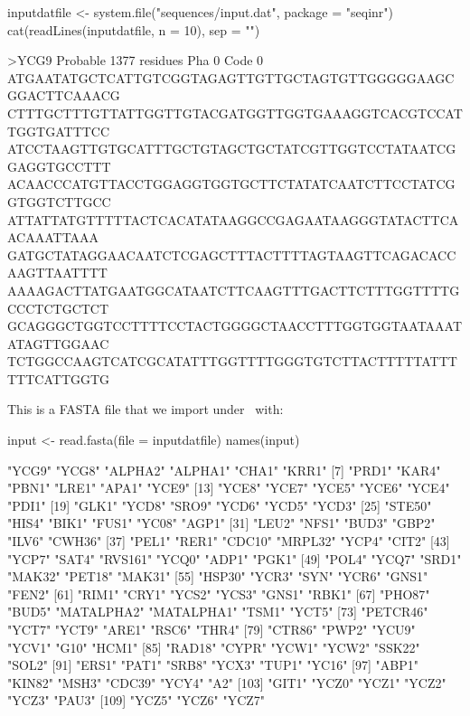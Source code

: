 \documentclass{article}
\begin{document}
\begin{Schunk}
\begin{Sinput}
 inputdatfile <- system.file("sequences/input.dat", package = "seqinr")
 cat(readLines(inputdatfile, n = 10), sep = "\n")
\end{Sinput}
\begin{Soutput}
>YCG9 Probable          1377 residues Pha 0 Code 0
ATGAATATGCTCATTGTCGGTAGAGTTGTTGCTAGTGTTGGGGGAAGCGGACTTCAAACG
CTTTGCTTTGTTATTGGTTGTACGATGGTTGGTGAAAGGTCACGTCCATTGGTGATTTCC
ATCCTAAGTTGTGCATTTGCTGTAGCTGCTATCGTTGGTCCTATAATCGGAGGTGCCTTT
ACAACCCATGTTACCTGGAGGTGGTGCTTCTATATCAATCTTCCTATCGGTGGTCTTGCC
ATTATTATGTTTTTACTCACATATAAGGCCGAGAATAAGGGTATACTTCAACAAATTAAA
GATGCTATAGGAACAATCTCGAGCTTTACTTTTAGTAAGTTCAGACACCAAGTTAATTTT
AAAAGACTTATGAATGGCATAATCTTCAAGTTTGACTTCTTTGGTTTTGCCCTCTGCTCT
GCAGGGCTGGTCCTTTTCCTACTGGGGCTAACCTTTGGTGGTAATAAATATAGTTGGAAC
TCTGGCCAAGTCATCGCATATTTGGTTTTGGGTGTCTTACTTTTTATTTTTTCATTGGTG
\end{Soutput}
\end{Schunk}

This is a FASTA file that we import under \Rlogo{}~with:

\begin{Schunk}
\begin{Sinput}
 input <- read.fasta(file = inputdatfile)
 names(input)
\end{Sinput}
\begin{Soutput}
  [1] "YCG9"      "YCG8"      "ALPHA2"    "ALPHA1"    "CHA1"      "KRR1"     
  [7] "PRD1"      "KAR4"      "PBN1"      "LRE1"      "APA1"      "YCE9"     
 [13] "YCE8"      "YCE7"      "YCE5"      "YCE6"      "YCE4"      "PDI1"     
 [19] "GLK1"      "YCD8"      "SRO9"      "YCD6"      "YCD5"      "YCD3"     
 [25] "STE50"     "HIS4"      "BIK1"      "FUS1"      "YC08"      "AGP1"     
 [31] "LEU2"      "NFS1"      "BUD3"      "GBP2"      "ILV6"      "CWH36"    
 [37] "PEL1"      "RER1"      "CDC10"     "MRPL32"    "YCP4"      "CIT2"     
 [43] "YCP7"      "SAT4"      "RVS161"    "YCQ0"      "ADP1"      "PGK1"     
 [49] "POL4"      "YCQ7"      "SRD1"      "MAK32"     "PET18"     "MAK31"    
 [55] "HSP30"     "YCR3"      "SYN"       "YCR6"      "GNS1"      "FEN2"     
 [61] "RIM1"      "CRY1"      "YCS2"      "YCS3"      "GNS1"      "RBK1"     
 [67] "PHO87"     "BUD5"      "MATALPHA2" "MATALPHA1" "TSM1"      "YCT5"     
 [73] "PETCR46"   "YCT7"      "YCT9"      "ARE1"      "RSC6"      "THR4"     
 [79] "CTR86"     "PWP2"      "YCU9"      "YCV1"      "G10"       "HCM1"     
 [85] "RAD18"     "CYPR"      "YCW1"      "YCW2"      "SSK22"     "SOL2"     
 [91] "ERS1"      "PAT1"      "SRB8"      "YCX3"      "TUP1"      "YC16"     
 [97] "ABP1"      "KIN82"     "MSH3"      "CDC39"     "YCY4"      "A2"       
[103] "GIT1"      "YCZ0"      "YCZ1"      "YCZ2"      "YCZ3"      "PAU3"     
[109] "YCZ5"      "YCZ6"      "YCZ7"     
\end{Soutput}
\end{Schunk}
\end{document}
